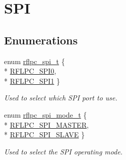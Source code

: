 \hypertarget{group__spi}{\section{S\-P\-I}
\label{group__spi}
}
\subsection*{Enumerations}
\begin{DoxyCompactItemize}
\item 
enum \hyperlink{group__spi_gacd0981a3c68e5b6af8c07d7638cb9156}{rflpc\-\_\-spi\-\_\-t} \{ \\*
\hyperlink{group__spi_ggacd0981a3c68e5b6af8c07d7638cb9156ae5a71c49b38c748942c3dfdb056c9fe6}{R\-F\-L\-P\-C\-\_\-\-S\-P\-I0}, 
\\*
\hyperlink{group__spi_ggacd0981a3c68e5b6af8c07d7638cb9156a741648e677756a1b0a630b3d6944a384}{R\-F\-L\-P\-C\-\_\-\-S\-P\-I1}
 \}
\begin{DoxyCompactList}\small\item\em Used to select which S\-P\-I port to use. \end{DoxyCompactList}\item 
enum \hyperlink{group__spi_gacdd9f294e5d1e913729ec8a9bb715e37}{rflpc\-\_\-spi\-\_\-mode\-\_\-t} \{ \\*
\hyperlink{group__spi_ggacdd9f294e5d1e913729ec8a9bb715e37ac50d7b09239e89014ed6fd314359c5bf}{R\-F\-L\-P\-C\-\_\-\-S\-P\-I\-\_\-\-M\-A\-S\-T\-E\-R}, 
\\*
\hyperlink{group__spi_ggacdd9f294e5d1e913729ec8a9bb715e37a4b75fd645e9016a1152cda505e1a66d7}{R\-F\-L\-P\-C\-\_\-\-S\-P\-I\-\_\-\-S\-L\-A\-V\-E}
 \}
\begin{DoxyCompactList}\small\item\em Used to select the S\-P\-I operating mode. \end{DoxyCompactList}\end{DoxyCompactItemize}
